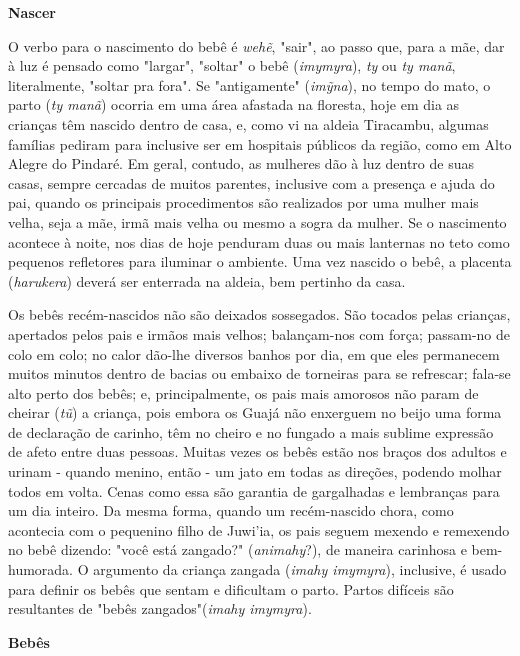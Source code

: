\textbf{Nascer}

O verbo para o nascimento do bebê é \emph{wehẽ}, "sair", ao passo que,
para a mãe, dar à luz é pensado como "largar", "soltar" o bebê
(\emph{imymyra}), \emph{ty} ou \emph{ty manã}, literalmente, "soltar pra
fora". Se "antigamente" (\emph{imỹna}), no tempo do mato, o parto
(\emph{ty manã}) ocorria em uma área afastada na floresta, hoje em dia
as crianças têm nascido dentro de casa, e, como vi na aldeia Tiracambu,
algumas famílias pediram para inclusive ser em hospitais públicos da
região, como em Alto Alegre do Pindaré. Em geral, contudo, as mulheres
dão à luz dentro de suas casas, sempre cercadas de muitos parentes,
inclusive com a presença e ajuda do pai, quando os principais
procedimentos são realizados por uma mulher mais velha, seja a mãe, irmã
mais velha ou mesmo a sogra da mulher. Se o nascimento acontece à noite,
nos dias de hoje penduram duas ou mais lanternas no teto como pequenos
refletores para iluminar o ambiente. Uma vez nascido o bebê, a placenta
(\emph{harukera}) deverá ser enterrada na aldeia, bem pertinho da casa.

Os bebês recém-nascidos não são deixados sossegados. São tocados pelas
crianças, apertados pelos pais e irmãos mais velhos; balançam-nos com
força; passam-no de colo em colo; no calor dão-lhe diversos banhos por
dia, em que eles permanecem muitos minutos dentro de bacias ou embaixo
de torneiras para se refrescar; fala-se alto perto dos bebês; e,
principalmente, os pais mais amorosos não param de cheirar (\emph{tũ}) a
criança, pois embora os Guajá não enxerguem no beijo uma forma de
declaração de carinho, têm no cheiro e no fungado a mais sublime
expressão de afeto entre duas pessoas. Muitas vezes os bebês estão nos
braços dos adultos e urinam - quando menino, então - um jato em todas as
direções, podendo molhar todos em volta. Cenas como essa são garantia de
gargalhadas e lembranças para um dia inteiro. Da mesma forma, quando um
recém-nascido chora, como acontecia com o pequenino filho de Juwi'ia, os
pais seguem mexendo e remexendo no bebê dizendo: "você está zangado?"
(\emph{animahy}?), de maneira carinhosa e bem-humorada. O argumento da
criança zangada (\emph{imahy imymyra}), inclusive, é usado para definir
os bebês que sentam e dificultam o parto. Partos difíceis são
resultantes de "bebês zangados"(\emph{imahy imymyra}).

\textbf{Bebês}

